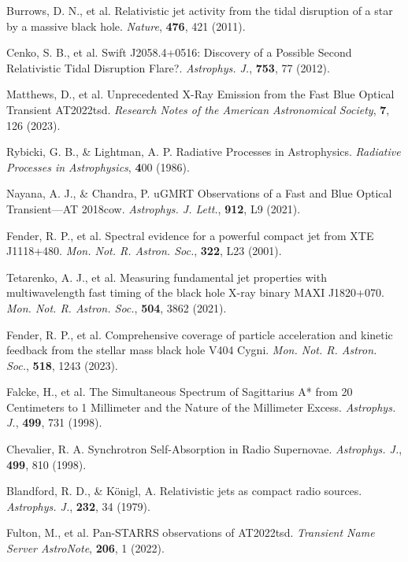 \documentclass{nature_plusfigure}
\newcommand{\mn}{{Mon. Not. R. Astron. Soc.}}
\newcommand{\mnras}{\mn}
\newcommand{\apj}{{Astrophys. J.}}
\newcommand{\apjl}{{Astrophys. J. Lett.}}
\newcommand{\nat}{{Nature}}
\begin{document}
\begin{methods}
\begin{thebibliography}{10}
  Burrows, D. N., et al. Relativistic jet activity from the tidal disruption of a star by a massive black hole. \emph{\nat}, \textbf{476}, 421 (2011). 

 Cenko, S. B., et al. Swift J2058.4+0516: Discovery of a Possible Second Relativistic Tidal Disruption Flare?. \emph{\apj}, \textbf{753}, 77 (2012). 

  Matthews, D., et al. Unprecedented X-Ray Emission from the Fast Blue Optical Transient AT2022tsd. \emph{Research Notes of the American Astronomical Society}, \textbf{7}, 126 (2023). 

 Rybicki, G. B., \& Lightman, A. P. Radiative Processes in Astrophysics. \emph{Radiative Processes in Astrophysics}, \textbf 400 (1986). 

 Nayana, A. J., \& Chandra, P. uGMRT Observations of a Fast and Blue Optical Transient—AT 2018cow. \emph{\apjl}, \textbf{912}, L9 (2021). 

 Fender, R. P., et al. Spectral evidence for a powerful compact jet from XTE J1118+480. \emph{\mnras}, \textbf{322}, L23 (2001).

 Tetarenko, A. J., et al. Measuring fundamental jet properties with multiwavelength fast timing of the black hole X-ray binary MAXI J1820+070. \emph{\mnras}, \textbf{504}, 3862 (2021).  

  Fender, R. P., et al. Comprehensive coverage of particle acceleration and kinetic feedback from the stellar mass black hole V404 Cygni. \emph{\mnras}, \textbf{518}, 1243 (2023). 
 
  Falcke, H., et al. The Simultaneous Spectrum of Sagittarius A* from 20 Centimeters to 1 Millimeter and the Nature of the Millimeter Excess. \emph{\apj}, \textbf{499}, 731 (1998). 

 Chevalier, R. A. Synchrotron Self-Absorption in Radio Supernovae. \emph{\apj}, \textbf{499}, 810 (1998). 

  Blandford, R. D., \& Königl, A. Relativistic jets as compact radio sources. \emph{\apj}, \textbf{232}, 34 (1979). 


 Fulton, M., et al. Pan-STARRS observations of AT2022tsd. \emph{Transient Name Server AstroNote}, \textbf{206}, 1 (2022). 


\end{thebibliography}
\end{methods}
\end{document}
